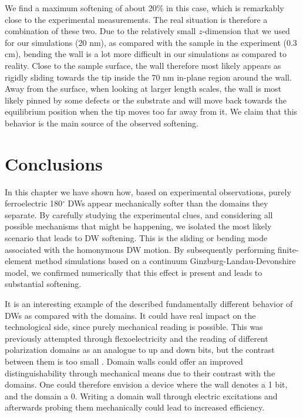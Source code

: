 We find a maximum softening of about 20\% in this case, which is remarkably close to the experimental measurements.
The real situation is therefore a combination of these two. Due to the relatively small $z$-dimension that we used for our simulations (20 nm), as compared with the sample in the experiment (0.3 cm), bending the wall is a lot more difficult in our simulations as compared to reality.
Close to the sample surface, the wall therefore most likely appears as rigidly sliding towards the tip inside the 70 nm in-plane region around the wall.
Away from the surface, when looking at larger length scales, the wall is most likely pinned by some defects or the substrate and will move back towards the equilibrium position when the tip moves too far away from it.
We claim that this behavior is the main source of the observed softening.

\section{Conclusions}
In this chapter we have shown how, based on experimental observations, purely ferroelectric 180$^\circ$ DWs appear mechanically softer than the domains they separate.
By carefully studying the experimental clues, and considering all possible mechanisms that might be happening, we isolated the most likely scenario that leads to DW softening.
This is the sliding or bending mode associated with the homonymous DW motion.
By subsequently performing finite-element method simulations based on a continuum Ginzburg-Landau-Devonshire model, we confirmed numerically that this effect is present and leads to substantial softening. 

It is an interesting example of the described fundamentally different behavior of DWs as compared with the domains.
It could have real impact on the technological side, since purely mechanical reading is possible.
This was previously attempted through flexoelectricity and the reading of different polarization domains as an analogue to up and down bits, but the contrast between them is too small \cite{Cordero-Edwards2017}.
Domain walls could offer an improved distinguishability through mechanical means due to their contrast with the domains.
One could therefore envision a device where the wall denotes a 1 bit, and the domain a 0.
Writing a domain wall through electric excitations and afterwards probing them mechanically could lead to increased efficiency.
